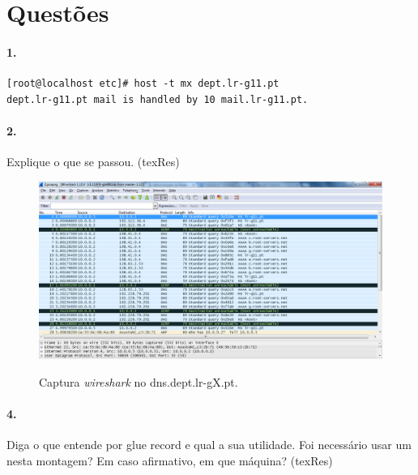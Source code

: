 \section*{Questões}
\paragraph{1.}

\begin{verbatim}
[root@localhost etc]# host -t mx dept.lr-g11.pt
dept.lr-g11.pt mail is handled by 10 mail.lr-g11.pt.
\end{verbatim}


\paragraph{2.}
Explique o que se passou. (texRes)

\begin{figure}[h]
\centering
\includegraphics[width=1\textwidth, height=0.35\textheight]{2_cap.png}
\label{fig:2-capturaWireshark}
\caption{Captura \emph{wireshark} no \textsf{dns.dept.lr-gX.pt}.}
\end{figure}











\paragraph{4.}
Diga o que entende por glue record e qual a sua utilidade. Foi necessário usar um nesta montagem? Em caso afirmativo, em que máquina? (texRes)


